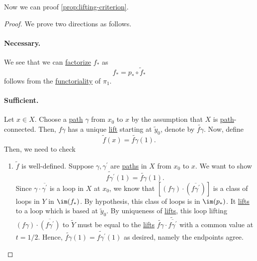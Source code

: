 Now we can proof \autoref{prop:lifting-criterion}.
\begin{proof}\let\qed\relax
	We prove two directions as follows.
	\paragraph{Necessary.} We see that we can \hyperref[def:factorization]{factorize} \(f_\ast\) as
	\[
		f_\ast = p_\ast \circ \widetilde{f} _\ast
	\]
	follows from the \hyperref[def:functor]{functoriality} of \(\pi _1\).
	\paragraph{Sufficient.} Let \(x\in X\). Choose a \hyperref[def:path]{path} \(\gamma\) from \(x_0\) to \(x\) by the assumption that \(X\) is \hyperref[def:path]{path}-connected.
	Then, \(f \gamma \) has a unique \hyperref[prop:homotopy-lifting-property]{lift} starting at \(\widetilde{y} _0\), denote by \(\widetilde{f\gamma}\).
	Now, define
	\[
		\widetilde{f} (x) = \widetilde{f \gamma } (1).
	\]
	Then, we need to check
	\begin{enumerate}
		\item \(\widetilde{f} \) is well-defined. Suppose \(\gamma , \gamma ^\prime \) are \hyperref[def:path]{paths} in \(X\) from \(x_0\)
		      to \(x\). We want to show
		      \[
			      \widetilde{f \gamma^\prime} (1) = \widetilde{f \gamma } (1).
		      \]
		      Since \(\gamma \cdot \overline{\gamma^\prime}\) is a loop in \(X\) at \(x_{0}\), we know that \([(f \gamma)\cdot (\overline{f \gamma ^\prime}) ]\) is a class of
		      loops in \(Y\) in \(\im  (f_\ast)\). By hypothesis, this class of loops is in \(\im  (p_*)\).
		      It \hyperref[prop:homotopy-lifting-property]{lifts} to a loop which is based at \(\widetilde{y} _0\). By uniqueness of
		      \hyperref[prop:homotopy-lifting-property]{lifts}, this loop lifting \((f \gamma )\cdot \overline{(f \gamma ^\prime )}\) to \(\widetilde{Y} \)
		      must be equal to the \hyperref[prop:homotopy-lifting-property]{lifts} \(\widetilde{f \gamma }\cdot \widetilde{\overline{f \gamma ^\prime }}  \)
		      with a common value at \(t = 1 / 2\). Hence, \(\widetilde{f \gamma }(1) = \widetilde{f \gamma ^\prime }(1)\) as desired, namely the endpoints agree.
		      \begin{figure}[H]
			      \centering
			      \label{fig:pf:prop:lifting-criterion}
		      \end{figure}
	\end{enumerate}
\end{proof}